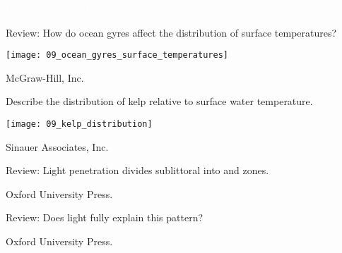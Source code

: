 \documentclass[t]{beamer}
\begin{document}

{
\begin{frame}[b]

	\tiny\textcolor{white}{Peter Southwood, Wikimedia, }
\end{frame}
}
%
\begin{frame}[t]{Review: How do ocean gyres affect the distribution of surface temperatures?}

	\texttt{[image: 09\_ocean\_gyres\_surface\_temperatures]}

	\vfilll
	
	\hfill \tiny \textcopyright McGraw-Hill, Inc.

\end{frame}
%
%
\begin{frame}[t]{Describe the distribution of kelp relative to surface water temperature.}

	\texttt{[image: 09\_kelp\_distribution]}

	\vfilll

	\hfill \tiny \textcopyright Sinauer Associates, Inc.

\end{frame}
%
{
\begin{frame}[b]{Review: Light penetration divides sublittoral into  and  zones.}

	\hfill \tiny \textcopyright Oxford University Press.
\end{frame}
}
%
{
\begin{frame}[b]{Review: Does light fully explain this pattern?}

	\hfill \tiny \textcopyright Oxford University Press.
\end{frame}
}
%
{
\begin{frame}[b]%

\end{frame}
}
\end{document}
